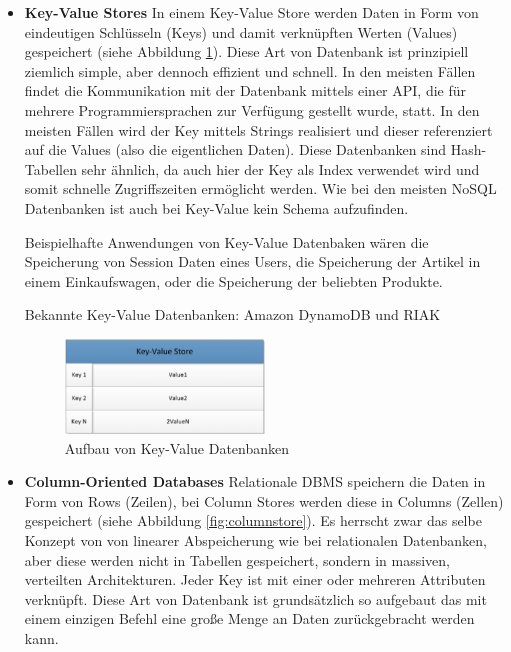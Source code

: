 \begin{itemize}
	\item \textbf{Key-Value Stores\newline}
	In einem Key-Value Store werden Daten in Form von eindeutigen Schlüsseln (Keys) und damit verknüpften Werten (Values) gespeichert (siehe Abbildung \ref{fig:keyvalue}). Diese Art von Datenbank ist prinzipiell ziemlich simple, aber dennoch effizient und schnell. In den meisten Fällen findet die Kommunikation mit der Datenbank mittels einer API, die für mehrere Programmiersprachen zur Verfügung gestellt wurde, statt. In den meisten Fällen wird der Key mittels Strings realisiert und dieser referenziert auf die Values (also die eigentlichen Daten). Diese Datenbanken sind Hash-Tabellen sehr ähnlich, da auch hier der Key als Index verwendet wird und somit schnelle Zugriffszeiten ermöglicht werden. Wie bei den meisten NoSQL Datenbanken ist auch bei Key-Value kein Schema aufzufinden.

	Beispielhafte Anwendungen von Key-Value Datenbaken wären die Speicherung von Session Daten eines Users, die Speicherung der Artikel in einem Einkaufswagen, oder die Speicherung der beliebten Produkte.

	Bekannte Key-Value Datenbanken: Amazon DynamoDB und RIAK\nextline

	\begin{figure}[h]\centering
		\includegraphics[width=0.5\textwidth]{images/keyvalueStore}
		\caption{Aufbau von Key-Value Datenbanken}
		\label{fig:keyvalue}
	\end{figure}

	\item \textbf{Column-Oriented Databases\newline}
	Relationale DBMS speichern die Daten in Form von Rows (Zeilen), bei Column Stores werden diese in Columns (Zellen) gespeichert (siehe Abbildung \ref{fig:columnstore}). Es herrscht zwar das selbe Konzept von von linearer Abspeicherung wie bei relationalen Datenbanken, aber diese werden nicht in Tabellen gespeichert, sondern in massiven, verteilten Architekturen. Jeder Key ist mit einer oder mehreren Attributen verknüpft. Diese Art von Datenbank ist grundsätzlich so aufgebaut das mit einem einzigen Befehl eine große Menge an Daten zurückgebracht werden kann. 


\end{itemize}
